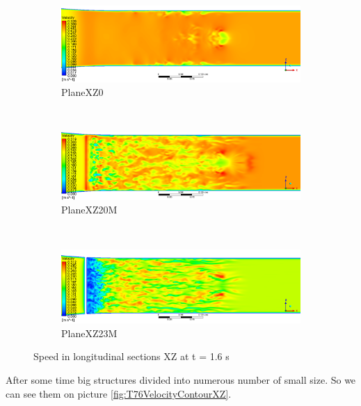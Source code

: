 	\begin{figure}[H]
		\begin{subfigure}{1\textwidth}
			\centering
			\includegraphics[width=1\linewidth]{../Assets/T16_Velocity_ContourXZ0}
			\caption{PlaneXZ0}
			\label{fig:T16VelocityContourXZ0}
		\end{subfigure}%
		\\
		\begin{subfigure}{1\textwidth}
			\centering
			\includegraphics[width=1\linewidth]{../Assets/T16_Velocity_ContourXZ20M}
			\caption{PlaneXZ20M}
			\label{fig:T16VelocityContourXZ20M}
		\end{subfigure}%
		\\
		\begin{subfigure}{1\textwidth}
			\centering
			\includegraphics[width=1\linewidth]{../Assets/T16_Velocity_ContourXZ23M}
			\caption{PlaneXZ23M}
			\label{fig:T16VelocityContourXZ23M}
		\end{subfigure}
		\caption{Speed in longitudinal sections XZ at t = 1.6 s}
		\label{fig:T16VelocityContourXZ}
	\end{figure}
	\newpage
	After some time big structures divided into numerous number of small size. So we can see them on picture \ref{fig:T76VelocityContourXZ}.
